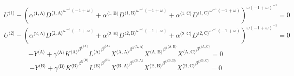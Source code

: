 \begin{equation}
{U}^{\langle \mathrm{1}\rangle} - \left({{\alpha}^{\langle \mathrm{\mathrm{1}},\mathrm{\mathrm{A}}\rangle}} {{{D}^{\langle \mathrm{1},\mathrm{A}\rangle}}^{{\omega}^{-1} \left(-1 + \omega\right)}} + {{\alpha}^{\langle \mathrm{\mathrm{1}},\mathrm{\mathrm{B}}\rangle}} {{{D}^{\langle \mathrm{1},\mathrm{B}\rangle}}^{{\omega}^{-1} \left(-1 + \omega\right)}} + {{\alpha}^{\langle \mathrm{\mathrm{1}},\mathrm{\mathrm{C}}\rangle}} {{{D}^{\langle \mathrm{1},\mathrm{C}\rangle}}^{{\omega}^{-1} \left(-1 + \omega\right)}}\right)^{{\omega} \left(-1 + \omega\right)^{-1}} = 0
\end{equation}
\begin{equation}
{U}^{\langle \mathrm{2}\rangle} - \left({{\alpha}^{\langle \mathrm{\mathrm{2}},\mathrm{\mathrm{A}}\rangle}} {{{D}^{\langle \mathrm{2},\mathrm{A}\rangle}}^{{\omega}^{-1} \left(-1 + \omega\right)}} + {{\alpha}^{\langle \mathrm{\mathrm{2}},\mathrm{\mathrm{B}}\rangle}} {{{D}^{\langle \mathrm{2},\mathrm{B}\rangle}}^{{\omega}^{-1} \left(-1 + \omega\right)}} + {{\alpha}^{\langle \mathrm{\mathrm{2}},\mathrm{\mathrm{C}}\rangle}} {{{D}^{\langle \mathrm{2},\mathrm{C}\rangle}}^{{\omega}^{-1} \left(-1 + \omega\right)}}\right)^{{\omega} \left(-1 + \omega\right)^{-1}} = 0
\end{equation}
\begin{equation}
-{Y}^{\langle \mathrm{A}\rangle} + {{\gamma}^{\langle \mathrm{\mathrm{A}}\rangle}} {{{K}^{\langle \mathrm{A}\rangle}}^{{\beta^{\mathrm{k}}}^{\langle \mathrm{\mathrm{A}}\rangle}}} {{{L}^{\langle \mathrm{A}\rangle}}^{{\beta^{\mathrm{l}}}^{\langle \mathrm{\mathrm{A}}\rangle}}} {{{X}^{\langle \mathrm{A},\mathrm{A}\rangle}}^{{\beta^{\mathrm{x}}}^{\langle \mathrm{\mathrm{A}},\mathrm{\mathrm{A}}\rangle}}} {{{X}^{\langle \mathrm{A},\mathrm{B}\rangle}}^{{\beta^{\mathrm{x}}}^{\langle \mathrm{\mathrm{A}},\mathrm{\mathrm{B}}\rangle}}} {{{X}^{\langle \mathrm{A},\mathrm{C}\rangle}}^{{\beta^{\mathrm{x}}}^{\langle \mathrm{\mathrm{A}},\mathrm{\mathrm{C}}\rangle}}} = 0
\end{equation}
\begin{equation}
-{Y}^{\langle \mathrm{B}\rangle} + {{\gamma}^{\langle \mathrm{\mathrm{B}}\rangle}} {{{K}^{\langle \mathrm{B}\rangle}}^{{\beta^{\mathrm{k}}}^{\langle \mathrm{\mathrm{B}}\rangle}}} {{{L}^{\langle \mathrm{B}\rangle}}^{{\beta^{\mathrm{l}}}^{\langle \mathrm{\mathrm{B}}\rangle}}} {{{X}^{\langle \mathrm{B},\mathrm{A}\rangle}}^{{\beta^{\mathrm{x}}}^{\langle \mathrm{\mathrm{B}},\mathrm{\mathrm{A}}\rangle}}} {{{X}^{\langle \mathrm{B},\mathrm{B}\rangle}}^{{\beta^{\mathrm{x}}}^{\langle \mathrm{\mathrm{B}},\mathrm{\mathrm{B}}\rangle}}} {{{X}^{\langle \mathrm{B},\mathrm{C}\rangle}}^{{\beta^{\mathrm{x}}}^{\langle \mathrm{\mathrm{B}},\mathrm{\mathrm{C}}\rangle}}} = 0
\end{equation}
